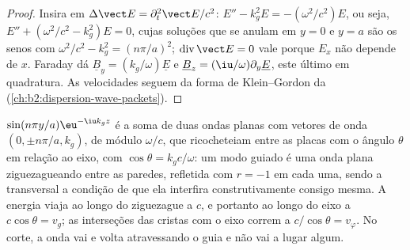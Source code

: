 \begin{proof}
Insira em $\Delta\vect E = \partial_t^2\vect E/c^2$: $E'' - k_g^2E = -(\omega^2/c^2)E$, ou seja,
$E'' + (\omega^2/c^2 - k_g^2)E = 0$, cujas soluções que se anulam em $y = 0$ e
$y = a$ são os senos com $\omega^2/c^2 - k_g^2 = (n\pi/a)^2$; $\operatorname{div}
\vect E = 0$ vale porque $E_x$ não depende de $x$. Faraday dá
$\underline B_y = (k_g/\omega)\underline E$ e $\underline B_z = (\iu/\omega)\partial_y\underline E$, este último
em quadratura. As velocidades seguem da forma de Klein--Gordon da
 (\cref{ch:b2:dispersion-wave-packets}).
\end{proof}

\begin{remark}\label{rem:b2:guided-waves:zigzag}
$\sin(n\pi y/a)\eu^{-\iu k_gz}$ é a soma de duas ondas planas com
vetores de onda $(0, \pm n\pi/a, k_g)$, de módulo $\omega/c$, que ricocheteiam entre
as placas com o ângulo $\theta$ em relação ao eixo, com $\cos\theta = k_gc/\omega$:
um modo guiado é uma onda plana ziguezagueando entre as paredes, refletida
com $r = -1$ em cada uma, sendo a  transversal a
condição de que ela interfira construtivamente consigo mesma. A energia
viaja ao longo do ziguezague a $c$, e portanto ao longo do eixo a $c\cos\theta = v_g$;
as interseções das cristas com o eixo correm a $c/\cos\theta = v_\varphi$. No
corte, a onda vai e volta atravessando o guia e não vai a
lugar algum.
\end{remark}


